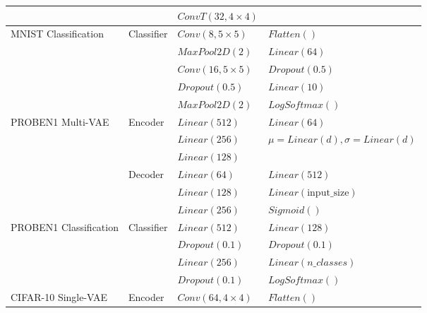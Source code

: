 \begin{table}[t]
{\begin{tabular}{l|l|ll}
                       &          & $ConvT(32, 4 \times 4)$          &                                       \\ \midrule
MNIST Classification   & Classifier & $Conv(8, 5 \times 5)$          & $Flatten()$                           \\
                       &            & $MaxPool2D(2)$                 & $Linear(64)$                          \\
                       &            & $Conv(16, 5 \times 5)$         & $Dropout(0.5)$                        \\
                       &            & $Dropout(0.5)$                 & $Linear(10)$                          \\
                       &            & $MaxPool2D(2)$                 & $LogSoftmax()$                        \\ \midrule
PROBEN1 Multi-VAE      & Encoder  & $Linear(512)$                    & $Linear(64)$                          \\
                       &          & $Linear(256)$                    & $\mu = Linear(d), \sigma = Linear(d)$ \\
                       &          & $Linear(128)$                    &                                       \\ \cline{2-4} 
                       & Decoder  & $Linear(64)$                     & $Linear(512)$                         \\
                       &          & $Linear(128)$                    & $Linear(\text{input\_size})$          \\
                       &          & $Linear(256)$                    & $Sigmoid()$                           \\ \midrule
PROBEN1 Classification & Classifier & $Linear(512)$                  & $Linear(128)$                         \\
                       &            & $Dropout(0.1)$                 & $Dropout(0.1)$                        \\
                       &            & $Linear(256)$                  & $Linear(n\_classes)$                  \\
                       &            & $Dropout(0.1)$                 & $LogSoftmax()$                        \\ \midrule
CIFAR-10 Single-VAE    & Encoder  & $Conv(64, 4 \times 4)$           & $Flatten()$                           \\

\end{tabular}}
\end{table}
